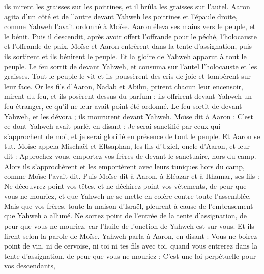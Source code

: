 \begin{multicols}{2}
ils mirent les graisses sur les poitrines, et il brûla les graisses sur l'autel.
Aaron agita d’un côté et de l’autre devant Yahweh les poitrines et l'épaule droite, comme Yahweh l'avait ordonné à Moïse.
Aaron éleva ses mains vers le peuple, et le bénit. Puis il descendit, après avoir offert l'offrande pour le péché, l'holocauste et l’offrande de paix.
Moïse et Aaron entrèrent dans la tente d'assignation, puis ils sortirent et ils bénirent le peuple. Et la gloire de Yahweh apparut à tout le peuple.
Le feu sortit de devant Yahweh, et consuma sur l'autel l'holocauste et les graisses. Tout le peuple le vit et ils poussèrent des cris de joie et tombèrent sur leur face.
\VerseOne{}Or les fils d'Aaron, Nadab et Abihu, prirent chacun leur encensoir, mirent du feu, et ils posèrent dessus du parfum ; ils offrirent devant Yahweh un feu étranger, ce qu'il ne leur avait point été ordonné.
Le feu sortit de devant Yahweh, et les dévora ; ils moururent devant Yahweh.
Moïse dit à Aaron : C'est ce dont Yahweh avait parlé, en disant : Je serai sanctifié par ceux qui s'approchent de moi, et je serai glorifié en présence de tout le peuple. Et Aaron se tut.
Moïse appela Mischaël et Eltsaphan, les fils d’Uziel, oncle d'Aaron, et leur dit : Approchez-vous, emportez vos frères de devant le sanctuaire, hors du camp.
Alors ils s'approchèrent et les emportèrent avec leurs tuniques hors du camp, comme Moïse l’avait dit.
Puis Moïse dit à Aaron, à Eléazar et à Ithamar, ses fils : Ne découvrez point vos têtes, et ne déchirez point vos vêtements, de peur que vous ne mouriez, et que Yahweh ne se mette en colère contre toute l'assemblée. Mais que vos frères, toute la maison d'Israël, pleurent à cause de l'embrasement que Yahweh a allumé.
Ne sortez point de l'entrée de la tente d'assignation, de peur que vous ne mouriez, car l'huile de l'onction de Yahweh est sur vous. Et ils firent selon la parole de Moïse.
Yahweh parla à Aaron, en disant :
Vous ne boirez point de vin, ni de cervoise, ni toi ni tes fils avec toi, quand vous entrerez dans la tente d'assignation, de peur que vous ne mouriez : C'est une loi perpétuelle pour vos descendants,

\end{multicols}
